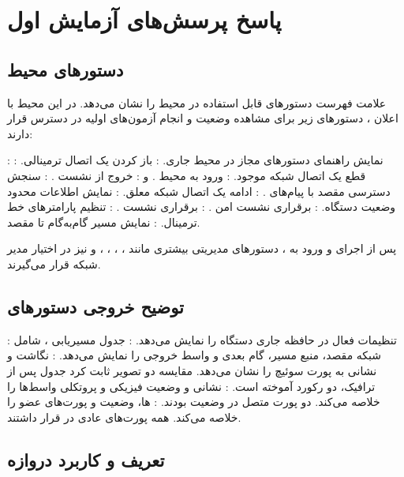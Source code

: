\section{پاسخ پرسش‌های آزمایش اول}

\subsection{دستورهای محیط }

علامت  فهرست دستورهای قابل استفاده در محیط  را نشان می‌دهد.
در این محیط با اعلان ، دستورهای زیر
برای مشاهده وضعیت و انجام آزمون‌های اولیه در دسترس قرار دارند:

 : نمایش راهنمای دستورهای مجاز در محیط جاری.
 : باز کردن یک اتصال ترمینالی.
 : قطع یک اتصال شبکه موجود.
 : ورود به محیط .
  و : خروج از نشست .
 : سنجش دسترسی مقصد با پیام‌های .
 : ادامه یک اتصال شبکه معلق.
 : نمایش اطلاعات محدود وضعیت دستگاه.
 : برقراری نشست امن .
 : برقراری نشست .
 : تنظیم پارامترهای خط ترمینال.
 : نمایش مسیر گام‌به‌گام تا مقصد.

پس از اجرای  و ورود به ، دستورهای مدیریتی بیشتری
مانند ، ، ، ،  و
 نیز در اختیار مدیر شبکه قرار می‌گیرند.

\subsection{توضیح خروجی دستورهای }

 : تنظیمات فعال در حافظه جاری دستگاه را نمایش می‌دهد.
 : جدول مسیریابی ، شامل شبکه مقصد، منبع مسیر،
گام بعدی و واسط خروجی را نمایش می‌دهد.
 : نگاشت  و نشانی  به پورت
سوئیچ را نشان می‌دهد. مقایسه دو تصویر ثابت کرد جدول پس از ترافیک، دو رکورد
 آموخته است.
 : نشانی و وضعیت فیزیکی و پروتکلی واسط‌ها را
خلاصه می‌کند. دو پورت متصل در وضعیت  بودند.
 : ها، وضعیت و پورت‌های عضو را خلاصه می‌کند.
همه پورت‌های عادی در  قرار داشتند.

\subsection{تعریف و کاربرد دروازه}

